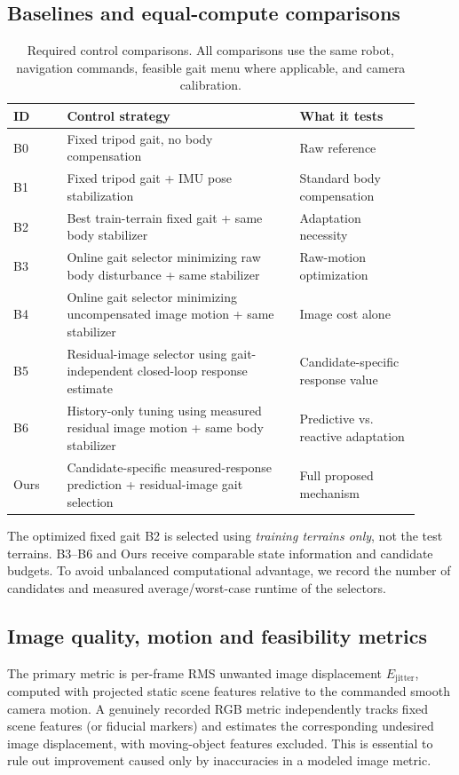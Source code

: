 \subsection{Baselines and equal-compute comparisons}
\begin{table}[ht]
\centering\small
\caption{Required control comparisons. All comparisons use the same robot, navigation commands, feasible gait menu where applicable, and camera calibration.}\label{tab:baselines}
\begin{tabular}{@{}p{0.12\linewidth}p{0.52\linewidth}p{0.27\linewidth}@{}}
\toprule
ID & Control strategy & What it tests \\
\midrule
B0 & Fixed tripod gait, no body compensation & Raw reference \\
B1 & Fixed tripod gait + IMU pose stabilization & Standard body compensation \\
B2 & Best train-terrain fixed gait + same body stabilizer & Adaptation necessity \\
B3 & Online gait selector minimizing raw body disturbance + same stabilizer & Raw-motion optimization \\
B4 & Online gait selector minimizing uncompensated image motion + same stabilizer & Image cost alone \\
B5 & Residual-image selector using gait-independent closed-loop response estimate & Candidate-specific response value \\
B6 & History-only tuning using measured residual image motion + same body stabilizer & Predictive vs. reactive adaptation \\
Ours & Candidate-specific measured-response prediction + residual-image gait selection & Full proposed mechanism \\
\bottomrule
\end{tabular}
\end{table}

The optimized fixed gait B2 is selected using \emph{training terrains only}, not the test terrains. B3--B6 and Ours receive comparable state information and candidate budgets. To avoid unbalanced computational advantage, we record the number of candidates and measured average/worst-case runtime of the selectors.

\subsection{Image quality, motion and feasibility metrics}
The primary metric is per-frame RMS unwanted image displacement $E_{\mathrm{jitter}}$, computed with projected static scene features relative to the commanded smooth camera motion. A genuinely recorded RGB metric independently tracks fixed scene features (or fiducial markers) and estimates the corresponding undesired image displacement, with moving-object features excluded. This is essential to rule out improvement caused only by inaccuracies in a modeled image metric.

